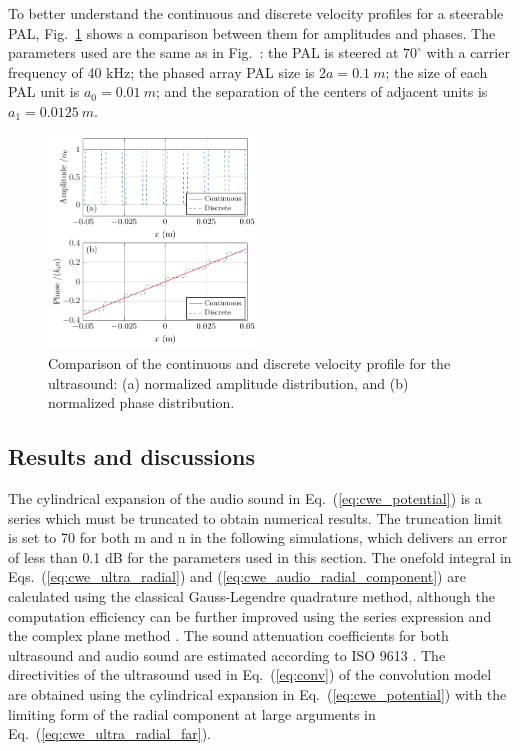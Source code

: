 To better understand the continuous and discrete velocity profiles for a steerable PAL, Fig.~\ref{fig:cwe_velocity_profile} shows a comparison between them for amplitudes and phases. 
The parameters used are the same as in Fig.~\cite{Shi2014OverviewDirectivityControl, Shi2015ConvolutionModelComputing}: the PAL is steered at $70^\circ$ with a carrier frequency of 40 kHz; 
the phased array PAL size is $2a =\SI{ 0.1}{m}$; the size of each PAL unit is $a_0 = \SI{0.01}{m}$; and the separation of the centers of adjacent units is $a_1 =\SI{ 0.0125}{m}$.

\begin{figure}[!htb]
    \centering
    \includegraphics[width = 0.5\textwidth]{fig/VelocityProfile_211023D}
    \caption{Comparison of the continuous and discrete velocity profile for the ultrasound: (a) normalized amplitude distribution, and (b) normalized phase distribution.}
    \label{fig:cwe_velocity_profile}
\end{figure}

\subsection{Results and discussions}
\label{sec:cwe_results}
The cylindrical expansion of the audio sound in Eq.~(\ref{eq:cwe_potential}) is a series which must be truncated to obtain numerical results. 
The truncation limit is set to 70 for both m and n in the following simulations, which delivers an error of less than 0.1 dB for the parameters used in this section. 
The onefold integral in Eqs.~(\ref{eq:cwe_ultra_radial}) and (\ref{eq:cwe_audio_radial_component}) are calculated using the classical Gauss-Legendre quadrature method, although the computation efficiency can be further improved using the series expression and the complex plane method \cite{Zhong2020SphericalExpansionAudio, Poletti2019CylindricalExpansionsSound}. 
The sound attenuation coefficients for both ultrasound and audio sound are estimated according to ISO 9613 \cite{1993ISO961311993}. 
The directivities of the ultrasound used in Eq.~(\ref{eq:conv}) of the convolution model are obtained using the cylindrical expansion in Eq.~(\ref{eq:cwe_potential}) with the limiting form of the radial component at large arguments in Eq.~(\ref{eq:cwe_ultra_radial_far}).

